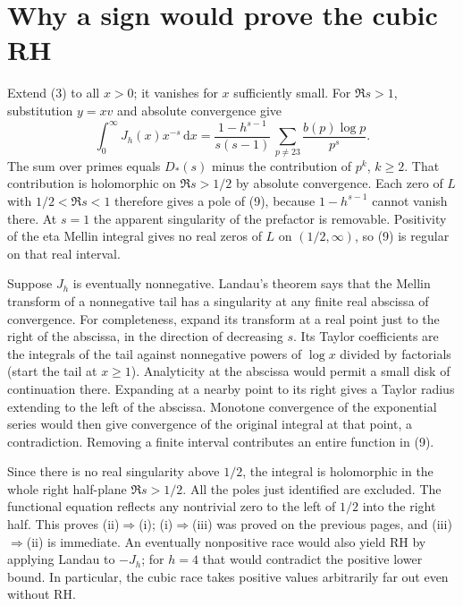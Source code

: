 \documentclass[11pt]{article}
\newcommand{\dd}{\,\mathrm d}
\begin{document}
\newpage
\section{Why a sign would prove the cubic RH}\label{obstruction}
Extend (3) to all $x>0$; it vanishes for $x$ sufficiently small. For $\Re s>1$, substitution $y=xv$ and absolute convergence give
\begin{equation}
 \int_0^\infty J_h(x)x^{-s}\dd x
   =\frac{1-h^{s-1}}{s(s-1)}\,
      \sum_{p\ne23}\frac{b(p)\log p}{p^s}.                         \tag{9}
\end{equation}
The sum over primes equals $D_*(s)$ minus the contribution of $p^k$, $k\ge2$. That contribution is holomorphic on $\Re s>1/2$ by absolute convergence. Each zero of $L$ with $1/2<\Re s<1$ therefore gives a pole of (9), because $1-h^{s-1}$ cannot vanish there. At $s=1$ the apparent singularity of the prefactor is removable. Positivity of the eta Mellin integral gives no real zeros of $L$ on $(1/2,\infty)$, so (9) is regular on that real interval.

Suppose $J_h$ is eventually nonnegative. Landau's theorem says that the Mellin transform of a nonnegative tail has a singularity at any finite real abscissa of convergence. For completeness, expand its transform at a real point just to the right of the abscissa, in the direction of decreasing $s$. Its Taylor coefficients are the integrals of the tail against nonnegative powers of $\log x$ divided by factorials (start the tail at $x\ge1$). Analyticity at the abscissa would permit a small disk of continuation there. Expanding at a nearby point to its right gives a Taylor radius extending to the left of the abscissa. Monotone convergence of the exponential series would then give convergence of the original integral at that point, a contradiction. Removing a finite interval contributes an entire function in (9).

Since there is no real singularity above $1/2$, the integral is holomorphic in the whole right half-plane $\Re s>1/2$. All the poles just identified are excluded. The functional equation reflects any nontrivial zero to the left of $1/2$ into the right half. This proves (ii)$\Rightarrow$(i); (i)$\Rightarrow$(iii) was proved on the previous pages, and (iii)$\Rightarrow$(ii) is immediate. An eventually nonpositive race would also yield RH by applying Landau to $-J_h$; for $h=4$ that would contradict the positive lower bound. In particular, the cubic race takes positive values arbitrarily far out even without RH.
\end{document}
